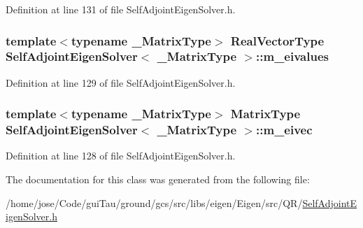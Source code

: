 Definition at line 131 of file Self\-Adjoint\-Eigen\-Solver.\-h.

\hypertarget{class_self_adjoint_eigen_solver_acff6540258711b3dfd52cd833e78ebb5}{
\subsubsection[{m\-\_\-eivalues}]{\setlength{\rightskip}{0pt plus 5cm}template$<$typename \-\_\-\-Matrix\-Type$>$ {\bf Real\-Vector\-Type} {\bf Self\-Adjoint\-Eigen\-Solver}$<$ \-\_\-\-Matrix\-Type $>$\-::m\-\_\-eivalues\hspace{0.3cm}{\ttfamily [protected]}}}\label{class_self_adjoint_eigen_solver_acff6540258711b3dfd52cd833e78ebb5}


Definition at line 129 of file Self\-Adjoint\-Eigen\-Solver.\-h.

\hypertarget{class_self_adjoint_eigen_solver_a920afdd9c7f98526217645ed6589c6a1}{
\subsubsection[{m\-\_\-eivec}]{\setlength{\rightskip}{0pt plus 5cm}template$<$typename \-\_\-\-Matrix\-Type$>$ {\bf Matrix\-Type} {\bf Self\-Adjoint\-Eigen\-Solver}$<$ \-\_\-\-Matrix\-Type $>$\-::m\-\_\-eivec\hspace{0.3cm}{\ttfamily [protected]}}}\label{class_self_adjoint_eigen_solver_a920afdd9c7f98526217645ed6589c6a1}


Definition at line 128 of file Self\-Adjoint\-Eigen\-Solver.\-h.



The documentation for this class was generated from the following file\-:\begin{DoxyCompactItemize}
\item 
/home/jose/\-Code/gui\-Tau/ground/gcs/src/libs/eigen/\-Eigen/src/\-Q\-R/\hyperlink{_self_adjoint_eigen_solver_8h}{Self\-Adjoint\-Eigen\-Solver.\-h}\end{DoxyCompactItemize}
